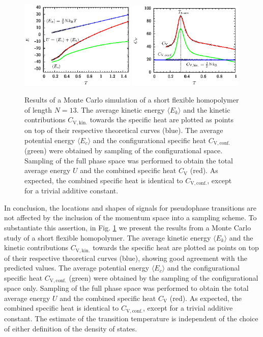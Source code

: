 \documentclass[12pt]{report}
\begin{document}
\begin{figure}
\center
\includegraphics[width = 0.49\textwidth]{chapter2Figs/N13Energy.eps}
\includegraphics[width = 0.49\textwidth]{chapter2Figs/N13Spec.eps}
\caption{\label{fig:Fig_6}%
Results of a Monte Carlo simulation of a short flexible homopolymer of length $N=13$. The average kinetic energy $\langle E _{k}\rangle$ and the kinetic contributions $C_{\mathrm{V,kin.}}$ towards the specific heat are plotted as points on top of their respective theoretical curves (blue). The average potential energy $\langle E_{c} \rangle$ and the configurational specific heat $C_{\mathrm{V},\mathrm{conf.}}$ (green) were obtained by sampling of the configurational space. Sampling of the full phase space was performed to obtain the total average energy $U$ and the combined specific heat $C_{\mathrm{V}}$ (red). As expected, the combined specific heat is identical to $C_{\mathrm{V},\mathrm{conf.}}$, except for a trivial additive constant.}
\end{figure}

In conclusion, the locations and shapes of signals for pseudophase transitions are not affected by the inclusion of the momentum space into a sampling scheme. To substantiate this assertion, in Fig. \ref{fig:Fig_6} we present the results from a Monte Carlo study of a short flexible homopolymer. The average kinetic energy $\langle E _{k}\rangle$ and the kinetic contributions $C_{\mathrm{V,kin.}}$ towards the specific heat are plotted as points on top of their respective theoretical curves (blue), showing good agreement with the predicted values. The average potential energy $\langle E_{c} \rangle$ and the configurational specific heat $C_{\mathrm{V},\mathrm{conf.}}$ (green) were obtained by the sampling of the configurational space only. Sampling of the full phase space was performed to obtain the total average energy $U$ and the combined specific heat $C_{\mathrm{V}}$ (red). As expected, the combined specific heat is identical to $C_{\mathrm{V},\mathrm{conf.}}$, except for a trivial additive constant. The estimate of the transition temperature is independent of the choice of either definition of the density of states. 
\newpage 
\end{document}

